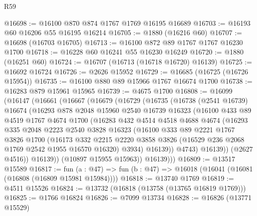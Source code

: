 \begin{lexlean}{R59}
\begin{coremodule}
@16698 := @16100 @870 @874 @1767 @1769 @16195 @16689
@16703 := @16193 @60 @16206 @55 @16195 @16214
@16705 := @1880 (@16216 @60)
@16707 := @16698 (@16703 @16705)
@16713 := @16100 @872 @89 @1767 @1767 @16230 @1700
@16718 := @16228 @60 @16241 @55 @16230 @16249
@16720 := @1880 (@16251 @60)
@16724 := @16707 (@16713 (@16718 @16720) @16139)
@16725 := @16692 @16724
@16726 := @2626 @15952
@16729 := @16685 (@16725 (@16726 @15954))
@16735 := @16100 @880 @89 @15966 @1767 @16674 @1700
@16738 := @16283 @879 @15961 @15965
@16739 := @4675 @1700
@16808 := @16099
    (@16147
      (@16661
        (@16667
          (@16679
            (@16729
              (@16735
                (@16738
                  (@2541 @16739)
                  @16674
                  (@16293
                    @878
                    @2048
                    @15960
                    @2540
                    @16739
                    @16323
                    (@16100
                      @433
                      @89
                      @4519
                      @1767
                      @4674
                      @1700
                      (@16283
                        @432
                        @4514
                        @4518
                        @4688
                        @4674
                        (@16293
                          @335
                          @2048
                          @2223
                          @2540
                          @3828
                          @16323
                          (@16100
                            @333
                            @89
                            @2221
                            @1767
                            @3826
                            @1700
                            (@16173
                              @332
                              @2215
                              @2220
                              @3858
                              @3826
                              (@16529 @236 @2068 @1769 @2542 @1955 @16570 @16320)
                              @3934)
                            @16139))
                        @4743)
                      @16139))
                  (@2627 @4516))
                @16139))
            (@10897 @15955 @15963))
          @16139)))
@16809 := @13517 @15589
@16817 := fun (a : @47) => fun (b : @47) => @16018 (@16041 (@16081 (@16808 (@16809 @15981 @15984))))
@16818 := @13740 @1769
@16819 := @4511 @15526
@16824 := @13732 (@16818 (@13758 (@13765 @16819 @1769)))
@16825 := @1766 @16824
@16826 := @7099 @13734
@16828 := @16826 (@13771 @15529)

\end{coremodule}
\end{lexlean}
